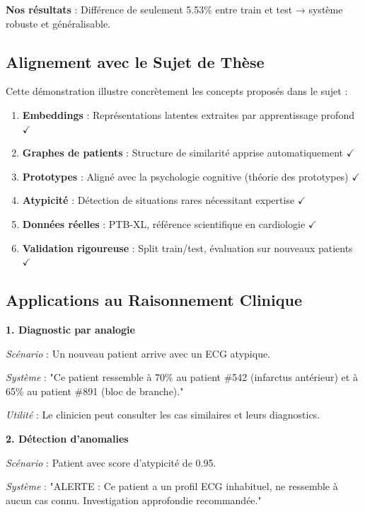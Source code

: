 \documentclass[12pt,a4paper]{article}
\begin{document}
\textbf{Nos résultats} : Différence de seulement 5.53\% entre train et test → système robuste et généralisable.

\subsection{Alignement avec le Sujet de Thèse}

Cette démonstration illustre concrètement les concepts proposés dans le sujet :

\begin{enumerate}
    \item \textbf{Embeddings} : Représentations latentes extraites par apprentissage profond $\checkmark$
    \item \textbf{Graphes de patients} : Structure de similarité apprise automatiquement $\checkmark$
    \item \textbf{Prototypes} : Aligné avec la psychologie cognitive (théorie des prototypes) $\checkmark$
    \item \textbf{Atypicité} : Détection de situations rares nécessitant expertise $\checkmark$
    \item \textbf{Données réelles} : PTB-XL, référence scientifique en cardiologie $\checkmark$
    \item \textbf{Validation rigoureuse} : Split train/test, évaluation sur nouveaux patients $\checkmark$
\end{enumerate}

\subsection{Applications au Raisonnement Clinique}

\textbf{1. Diagnostic par analogie}

\textit{Scénario} : Un nouveau patient arrive avec un ECG atypique.

\textit{Système} : "Ce patient ressemble à 70\% au patient \#542 (infarctus antérieur) et à 65\% au patient \#891 (bloc de branche)."

\textit{Utilité} : Le clinicien peut consulter les cas similaires et leurs diagnostics.

\textbf{2. Détection d'anomalies}

\textit{Scénario} : Patient avec score d'atypicité de 0.95.

\textit{Système} : "ALERTE : Ce patient a un profil ECG inhabituel, ne ressemble à aucun cas connu. Investigation approfondie recommandée."
\end{document}
